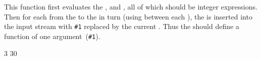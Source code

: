 \documentclass[oneside]{book}
\begin{document}

\begin{function}{\IntStepInline}
\begin{syntax}
    
\end{syntax}
This function first evaluates the , 
and , all of which should be integer expressions.
Then for each  from the  to the
 in turn (using  between each
), the  is inserted into the input stream
with \verb|#1| replaced by the current . Thus the
 should define a function of one argument~(\verb|#1|).
\begin{demohigh}
\IgnoreSpacesOn
\TlClear \lTmpaTl
{} {3} {30} {
  \TlPutRight \lTmpaTl {[#1]}
}
\TlUse \lTmpaTl
\IgnoreSpacesOff
\end{demohigh}
\end{function}
\end{document}
